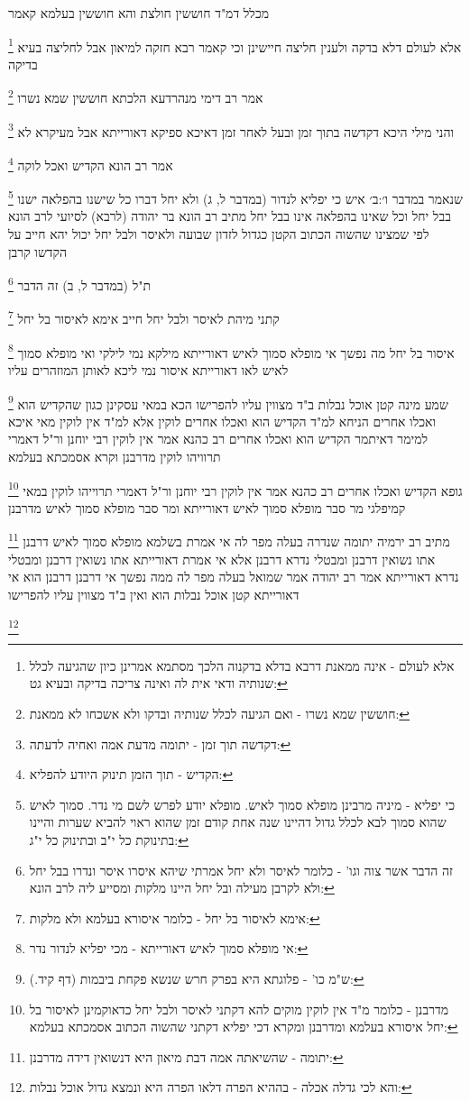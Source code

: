 \documentclass[12pt, openany]{book}
\newcommand{\footnotecomment}[1]{
	\renewcommand\thefootnote{}
	\footnote{#1}}
\newcommand{\commenta}[1]{\footnotecomment{#1}}
\begin{document}
{מכלל דמ"ד חוששין חולצת והא חוששין בעלמא קאמר 
\commenta{אלא לעולם - אינה ממאנת דרבא בדלא בדקנוה הלכך מסתמא אמרינן כיון שהגיעה לכלל שנותיה ודאי אית לה ואינה צריכה בדיקה ובעיא גט: }
אלא לעולם דלא בדקה ולענין חליצה חיישינן וכי קאמר רבא חזקה למיאון אבל לחליצה בעיא בדיקה 
\commenta{חוששין שמא נשרו - ואם הגיעה לכלל שנותיה ובדקו ולא אשכחו לא ממאנת:}
אמר רב דימי מנהרדעא הלכתא חוששין שמא נשרו 
\commenta{דקדשה תוך זמן - יתומה מדעת אמה ואחיה לדעתה:}
והני מילי היכא דקדשה בתוך זמן ובעל לאחר זמן דאיכא ספיקא דאורייתא אבל מעיקרא לא 
\commenta{הקדיש - תוך הזמן תינוק היודע להפליא:}
אמר רב הונא הקדיש ואכל לוקה
\commenta{כי יפליא - מיניה מרבינן מופלא סמוך לאיש. מופלא יודע לפרש לשם מי נדר. סמוך לאיש שהוא סמוך לבא לכלל גדול דהיינו שנה אחת קודם זמן שהוא ראוי להביא שערות והיינו בתינוקת כל י"ב ובתינוק כל י"ג:}
שנאמר {במדבר ו׳:ב׳ } איש כי יפליא לנדור (במדבר ל, ג) ולא יחל דברו כל שישנו בהפלאה ישנו בבל יחל וכל שאינו בהפלאה אינו בבל יחל 
מתיב רב הונא בר יהודה (לרבא) לסיועי לרב הונא
לפי שמצינו שהשוה הכתוב הקטן כגדול לזדון שבועה ולאיסר ולבל יחל יכול יהא חייב על הקדשו קרבן 
\commenta{זה הדבר אשר צוה וגו' - כלומר לאיסר ולא יחל אמרתי שיהא איסרו איסר ונדרו בבל יחל ולא לקרבן מעילה ובל יחל היינו מלקות ומסייע ליה לרב הונא:}
ת"ל (במדבר ל, ב) זה הדבר 
\commenta{אימא לאיסור בל יחל - כלומר איסורא בעלמא ולא מלקות:}
קתני מיהת לאיסר ולבל יחל חייב אימא לאיסור בל יחל 
\commenta{אי מופלא סמוך לאיש דאורייתא - מכי יפליא לנדור נדר:}
איסור בל יחל מה נפשך אי מופלא סמוך לאיש דאורייתא מילקא נמי לילקי ואי מופלא סמוך לאיש לאו דאורייתא איסור נמי ליכא לאותן המוזהרים עליו 
\commenta{ש"מ כו' - פלוגתא היא בפרק חרש שנשא פקחת ביבמות (דף קיד.):}
שמע מינה קטן אוכל נבלות ב"ד מצווין עליו להפרישו הכא במאי עסקינן כגון שהקדיש הוא ואכלו אחרים 
הניחא למ"ד הקדיש הוא ואכלו אחרים לוקין אלא למ"ד אין לוקין מאי איכא למימר דאיתמר הקדיש הוא ואכלו אחרים רב כהנא אמר אין לוקין רבי יוחנן ור"ל דאמרי תרוויהו לוקין 
מדרבנן וקרא אסמכתא בעלמא 
\commenta{מדרבנן - כלומר מ"ד אין לוקין מוקים להא דקתני לאיסר ולבל יחל כדאוקמינן לאיסור בל יחל איסורא בעלמא ומדרבנן ומקרא דכי יפליא דקתני שהשוה הכתוב אסמכתא בעלמא:}
גופא הקדיש ואכלו אחרים רב כהנא אמר אין לוקין רבי יוחנן ור"ל דאמרי תרוייהו לוקין במאי קמיפלגי מר סבר מופלא סמוך לאיש דאורייתא ומר סבר מופלא סמוך לאיש מדרבנן 
\commenta{יתומה - שהשיאתה אמה דבת מיאון היא דנשואין דידה מדרבנן:}
מתיב רב ירמיה יתומה שנדרה בעלה מפר לה אי אמרת בשלמא מופלא סמוך לאיש דרבנן אתו נשואין דרבנן ומבטלי נדרא דרבנן אלא אי אמרת דאורייתא אתו נשואין דרבנן ומבטלי נדרא דאורייתא 
אמר רב יהודה אמר שמואל בעלה מפר לה ממה נפשך אי דרבנן דרבנן הוא אי דאורייתא קטן אוכל נבלות הוא ואין ב"ד מצווין עליו להפרישו 
\commenta{והא לכי גדלה אכלה - בההיא הפרה דלאו הפרה היא ונמצא גדול אוכל נבלות:}
}
\end{document}
